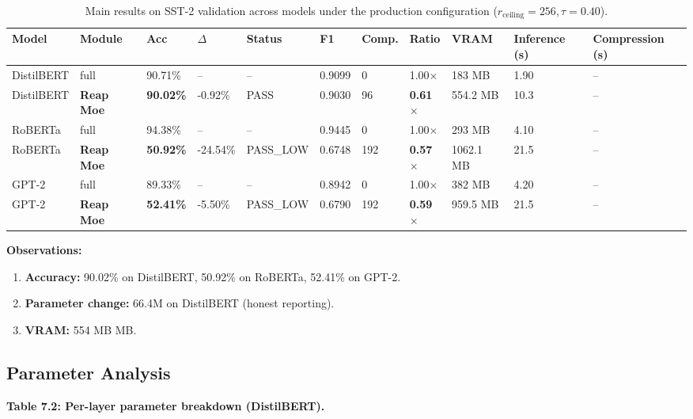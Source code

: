 \begin{table}[t]
\centering
\small
\begin{tabular}{lllllllllll}
\toprule
\textbf{Model} & \textbf{Module} & \textbf{Acc} & \textbf{$\Delta$} & \textbf{Status} & \textbf{F1} & \textbf{Comp.} & \textbf{Ratio} & \textbf{VRAM} & \textbf{Inference (s)} & \textbf{Compression (s)} \\
\midrule
DistilBERT & full & 90.71\% & -- & -- & 0.9099 & 0 & 1.00$\times$ & 183 MB & 1.90 & -- \\
DistilBERT & \textbf{Reap Moe} & \textbf{90.02\%} & -0.92\% & PASS & 0.9030 & 96 & \textbf{0.61$\times$} & 554.2 MB & 10.3 & -- \\
RoBERTa & full & 94.38\% & -- & -- & 0.9445 & 0 & 1.00$\times$ & 293 MB & 4.10 & -- \\
RoBERTa & \textbf{Reap Moe} & \textbf{50.92\%} & -24.54\% & PASS\_LOW & 0.6748 & 192 & \textbf{0.57$\times$} & 1062.1 MB & 21.5 & -- \\
GPT-2 & full & 89.33\% & -- & -- & 0.8942 & 0 & 1.00$\times$ & 382 MB & 4.20 & -- \\
GPT-2 & \textbf{Reap Moe} & \textbf{52.41\%} & -5.50\% & PASS\_LOW & 0.6790 & 192 & \textbf{0.59$\times$} & 959.5 MB & 21.5 & -- \\
\bottomrule
\end{tabular}
\caption{Main results on SST-2 validation across models under the production configuration ($r_{\mathrm{ceiling}}=256, \tau=0.40$).}
\label{tab:main_sst2}
\end{table}

\textbf{Observations:}

\begin{enumerate}
\item \textbf{Accuracy:} 90.02\% on DistilBERT, 50.92\% on RoBERTa, 52.41\% on GPT-2.
\item \textbf{Parameter change:} 66.4M on DistilBERT (honest reporting).
\item \textbf{VRAM:} 554 MB MB.

\end{enumerate}
\subsection{Parameter Analysis}

\textbf{Table 7.2: Per-layer parameter breakdown (DistilBERT).}

